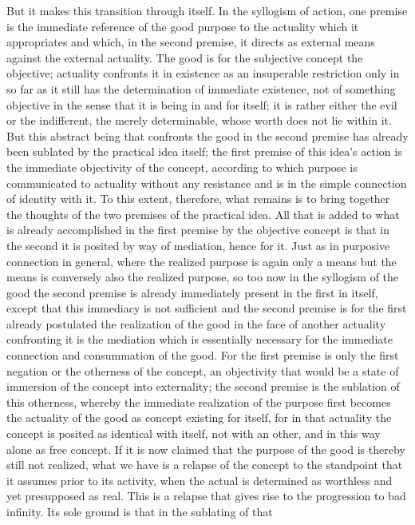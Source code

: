 But it makes this transition through itself. In the syllogism of action, one
premise is the immediate reference of the good purpose to the actuality which
it appropriates and which, in the second premise, it directs as external
means against the external actuality. The good is for the subjective concept
the objective; actuality confronts it in existence as an insuperable restriction
only in so far as it still has the determination of immediate existence, not
of something objective in the sense that it is being in and for itself; it is
rather either the evil or the indifferent, the merely determinable, whose
worth does not lie within it. But this abstract being that confronts the
good in the second premise has already been sublated by the practical idea
itself; the first premise of this idea's action is the immediate objectivity of
the concept, according to which purpose is communicated to actuality
without any resistance and is in the simple connection of identity with it.
To this extent, therefore, what remains is to bring together the thoughts of
the two premises of the practical idea. All that is added to what is already
accomplished in the first premise by the objective concept is that in the
second it is posited by way of mediation, hence for it. Just as in purposive
connection in general, where the realized purpose is again only a means
but the means is conversely also the realized purpose, so too now in the
syllogism of the good the second premise is already immediately present in
the first in itself, except that this immediacy is not sufficient and the second
premise is for the first already postulated
the realization of the good in the
face of another actuality confronting it is the mediation which is essentially
necessary for the immediate connection and consummation of the good.
For the first premise is only the first negation or the otherness of the concept,
an objectivity that would be a state of immersion of the concept into
externality; the second premise is the sublation of this otherness, whereby
the immediate realization of the purpose first becomes the actuality of
the good as concept existing for itself, for in that actuality the concept is
posited as identical with itself, not with an other, and in this way alone as
free concept. If it is now claimed that the purpose of the good is thereby
still not realized, what we have is a relapse of the concept to the standpoint
that it assumes prior to its activity, when the actual is determined as
worthless and yet presupposed as real. This is a relapse that gives rise to the
progression to bad infinity. Its sole ground is that in the sublating of that
